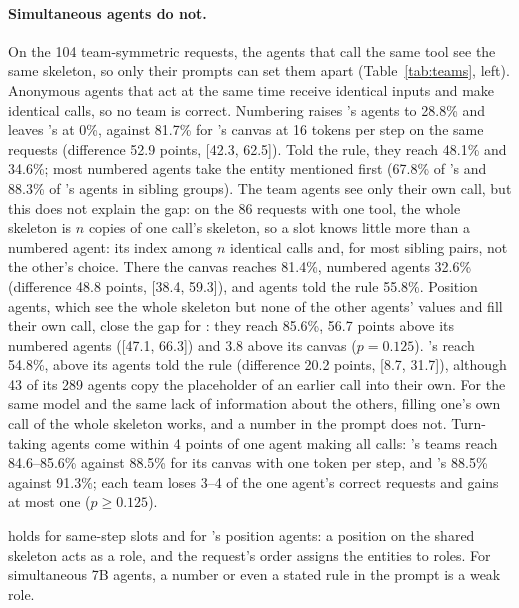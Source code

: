 \paragraph{Simultaneous agents do not.} On the 104 team-symmetric requests, the agents that call the same tool see the same skeleton, so only their prompts can set them apart (Table~\ref{tab:teams}, left). Anonymous agents that act at the same time receive identical inputs and make identical calls, so no team is correct. Numbering raises \dream's agents to 28.8\% and leaves \qwen's at 0\%, against 81.7\% for \dream's canvas at 16 tokens per step on the same requests (difference 52.9 points, [42.3, 62.5]). Told the rule, they reach 48.1\% and 34.6\%; most numbered agents take the entity mentioned first (67.8\% of \dream's and 88.3\% of \qwen's agents in sibling groups). The team agents see only their own call, but this does not explain the gap: on the 86 requests with one tool, the whole skeleton is $n$ copies of one call's skeleton, so a slot knows little more than a numbered agent: its index among $n$ identical calls and, for most sibling pairs, not the other's choice. There the canvas reaches 81.4\%, numbered agents 32.6\% (difference 48.8 points, [38.4, 59.3]), and agents told the rule 55.8\%. Position agents, which see the whole skeleton but none of the other agents' values and fill their own call, close the gap for \dream: they reach 85.6\%, 56.7 points above its numbered agents ([47.1, 66.3]) and 3.8 above its canvas ($p=0.125$). \qwen's reach 54.8\%, above its agents told the rule (difference 20.2 points, [8.7, 31.7]), although 43 of its 289 agents copy the placeholder of an earlier call into their own. For the same model and the same lack of information about the others, filling one's own call of the whole skeleton works, and a number in the prompt does not. Turn-taking agents come within 4 points of one agent making all calls: \dream's teams reach 84.6--85.6\% against 88.5\% for its canvas with one token per step, and \qwen's 88.5\% against 91.3\%; each team loses 3--4 of the one agent's correct requests and gains at most one ($p\geq0.125$).

 holds for same-step slots and for \dream's position agents: a position on the shared skeleton acts as a role, and the request's order assigns the entities to roles. For simultaneous 7B agents, a number or even a stated rule in the prompt is a weak role.
